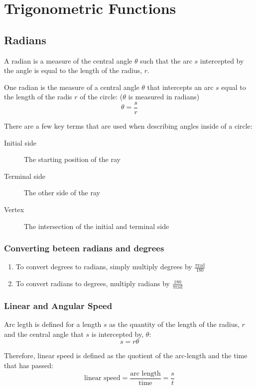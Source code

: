 \chapter{Trigonometric Functions}
\section{Radians}
A radian is a measure of the central angle $\theta$ such that the arc $s$
intercepted by the angle is equal to the length of the radius, $r$.

One radian is the measure of a central angle $\theta$ that intercepts an arc $s$
equal to the length of the radis $r$ of the circle: ($\theta$ is measured in
radians)
\begin{equation}
  \theta=\frac{s}{r}
\end{equation}

There are a few key terms that are used when describing angles inside of a
circle:
\begin{description}
  \item[Initial side]{The starting position of the ray}
  \item[Terminal side]{The other side of the ray}
  \item[Vertex]{The intersection of the initial and terminal side}
\end{description}

\subsection{Converting beteen radians and degrees}
\begin{enumerate}
  \item{To convert degrees to radians, simply multiply degrees by
    $\frac{\pi\text{rad}}{180}$}
  \item{To convert radians to degrees, multiply radians by
    $\frac{180}{\pi\text{rad}}$}
\end{enumerate}

\subsection{Linear and Angular Speed}
Arc legth is defined for a length $s$ as the quantity of the length of the
radius, $r$ and the central angle that $s$ is intercepted by, $\theta$:
\begin{equation}
  s=r\theta
\end{equation}

Therefore, linear speed is defined as the quotient of the arc-length and the
time that has passed:
\begin{equation}
  \text{linear speed}=\frac{\text{arc length}}{\text{time}}=\frac{s}{t}
\end{equation}

